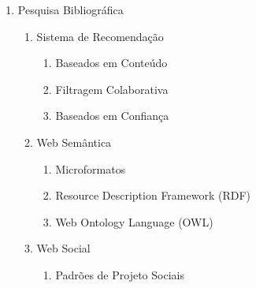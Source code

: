 \documentclass[]{article}
\begin{document}
\begin{enumerate}
		
	\item Pesquisa Bibliográfica
	\begin{enumerate}
		\item Sistema de Recomendação
		\begin{enumerate}
			\item Baseados em Conteúdo
			\item Filtragem Colaborativa
			\item Baseados em Confiança
		\end{enumerate}
		\item Web Semântica
		\begin{enumerate}
		  \item Microformatos
			\item Resource Description Framework (RDF)
			\item Web Ontology Language (OWL)
		\end{enumerate}
		\item Web Social
		\begin{enumerate}
		  \item Padrões de Projeto Sociais
		\end{enumerate}
	\end{enumerate}
	

\end{enumerate}
\end{document}

